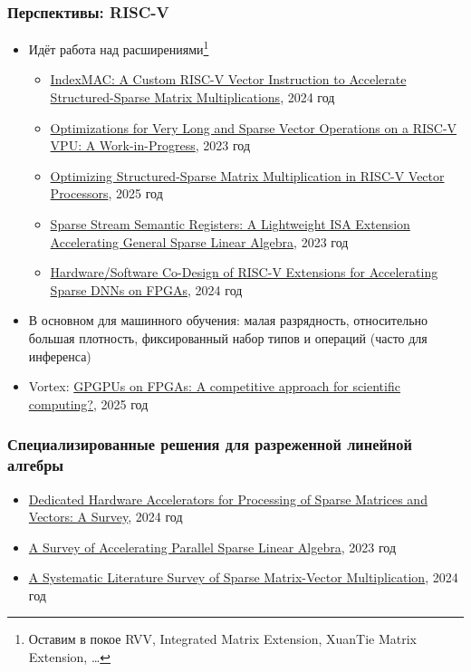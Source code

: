\documentclass[xcolor=table,aspectratio=169]{beamer}
\begin{document}
\begin{frame}[fragile]
  \frametitle{Перспективы: RISC-V}
  \begin{itemize}
    \item Идёт работа над расширениями\footnote{Оставим в покое RVV, Integrated Matrix Extension, XuanTie Matrix Extension, \ldots}   
    \begin{itemize}
      \item \href{https://ieeexplore.ieee.org/abstract/document/10546747}{IndexMAC: A Custom RISC-V Vector Instruction to Accelerate Structured-Sparse Matrix Multiplications}, 2024 год
      \item \href{https://dl.acm.org/doi/abs/10.1007/978-3-031-40843-4_35}{Optimizations for Very Long and Sparse Vector Operations on a RISC-V VPU: A Work-in-Progress}, 2023 год
      \item \href{https://dl.acm.org/doi/10.1109/TC.2025.3533083}{Optimizing Structured-Sparse Matrix Multiplication in RISC-V Vector Processors}, 2025 год
      \item \href{https://ieeexplore.ieee.org/abstract/document/10271722}{Sparse Stream Semantic Registers: A Lightweight ISA Extension Accelerating General Sparse Linear Algebra}, 2023 год
      \item \href{https://ieeexplore.ieee.org/abstract/document/11113397}{Hardware/Software Co-Design of RISC-V Extensions for Accelerating Sparse DNNs on FPGAs}, 2024 год       
    \end{itemize}
    \item В основном для машинного обучения: малая разрядность, относительно большая плотность, фиксированный набор типов и операций (часто для инференса)
    \item Vortex: \href{https://cea.hal.science/cea-05043041v1/document}{GPGPUs on FPGAs: A competitive approach for scientific computing?}, 2025 год
  \end{itemize}
\end{frame}

\begin{frame}[fragile]
  \frametitle{Специализированные решения для разреженной линейной алгебры}
  \begin{itemize}
    \item \href{https://dl.acm.org/doi/10.1145/3640542}{Dedicated Hardware Accelerators for Processing of Sparse Matrices and Vectors: A Survey}, 2024 год
    \item \href{https://dl.acm.org/doi/10.1145/3604606}{A Survey of Accelerating Parallel Sparse Linear Algebra}, 2023 год
    \item \href{https://dl.acm.org/doi/abs/10.1145/3571157}{A Systematic Literature Survey of Sparse Matrix-Vector Multiplication}, 2024 год
  \end{itemize}
\end{frame}
\end{document}
